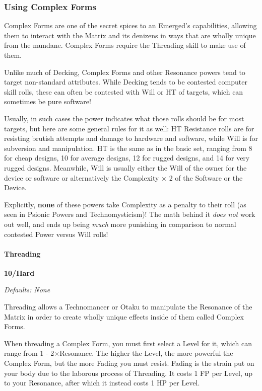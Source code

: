 \begin{multicols*}{3}
	\subsubsection{Using Complex Forms}
	
	Complex Forms are one of the secret spices to an Emerged's capabilities, allowing them to interact with the Matrix and its denizens in ways that are wholly unique from the mundane. Complex Forms require the Threading skill to make use of them.
	
	Unlike much of Decking, Complex Forms and other Resonance powers tend to target non-standard attributes. While Decking tends to be contested computer skill rolls, these can often be contested with Will or HT of targets, which can sometimes be pure software! 
	
	Usually, in such cases the power indicates what those rolls should be for most targets, but here are some general rules for it as well: HT Resistance rolls are for resisting brutish attempts and damage to hardware and software, while Will is for subversion and manipulation. HT is the same as in the basic set, ranging from 8 for cheap designs, 10 for average designs, 12 for rugged designs, and 14 for very rugged designs. Meanwhile, Will is usually either the Will of the owner for the device or software or alternatively the Complexity $\times$ 2 of the Software or the Device.
	
	Explicitly, \textbf{none} of these powers take Complexity as a penalty to their roll (as seen in Psionic Powers and Technomysticism)! The math behind it \textit{does not} work out well, and ends up being \textit{much} more punishing in comparison to normal contested Power versus Will rolls!
	
	\paragraph{Threading}\label{threading}
	\begin{flushright}
		\textbf{10/Hard}
	\end{flushright}
	\textcolor{NavyBlue}{\textit{Defaults: None}}
	
	Threading allows a Technomancer or Otaku to manipulate the Resonance of the Matrix in order to create wholly unique effects inside of them called Complex Forms.
	
	When threading a Complex Form, you must first select a Level for it, which can range from 1 - 2\(\times\)Resonance. The higher the Level, the more powerful the Complex Form, but the more Fading you must resist. Fading is the strain put on your body due to the laborous process of Threading. It costs 1 FP per Level, up to your Resonance, after which it instead costs 1 HP per Level.
	

\end{multicols*}
